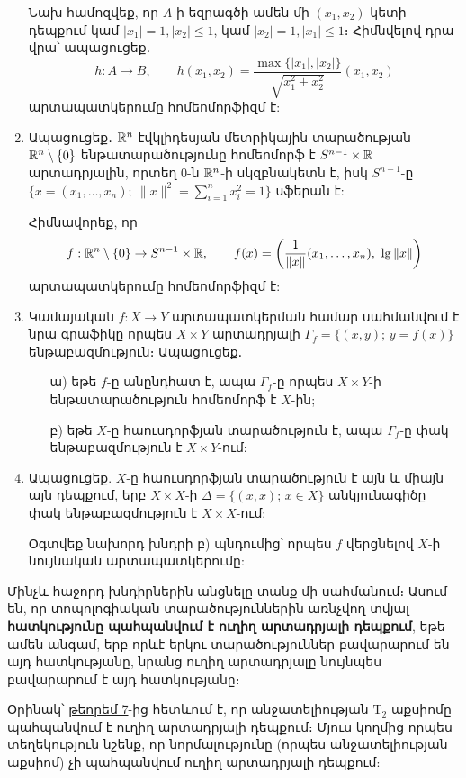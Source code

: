 \begin{enumerate}[label=\thesection.\arabic*.]
\begin{hint}
Նախ համոզվեք, որ $A$-ի եզրագծի ամեն մի $(x_1, x_2)$ կետի դեպքում կամ $|x_1|=1, |x_2| \le 1$, կամ $|x_2|=1, |x_1| \le 1$։ Հիմնվելով դրա վրա՝ ապացուցեք․
\[
h: A \to B, \qquad h(x_1, x_2) = \frac{\max\{|x_1|, |x_2|\}}{\sqrt{x_1^2+x_2^2}}(x_1, x_2)
\] 
արտապատկերումը հոմեոմորֆիզմ է:
\end{hint}

\item Ապացուցեք․ $\mathbb{R}^n$ էվկլիդեսյան մետրիկային տարածության $\mathbb{R}^n \setminus \{0\}$ ենթա\-տա\-րածությունը հոմեոմորֆ է $S^{n-1} \times \mathbb{R}$ արտադրյալին, որտեղ $0$-ն $\mathbb{R}^n$-ի սկզբնա\-կետն է, իսկ $S^{n-1}$-ը $\big\{x=(x_1, \dots, x_n);\ \|x\|^2 = \sum\limits_{i=1}^n x_i^2=1\big\}$ սֆերան է:

\begin{hint}
Հիմնավորեք, որ 
\[
f: \mathbb{R}^n \setminus \{0\} \to S^{n-1} \times \mathbb{R}, \qquad f(x)=\left(\frac{1}{\|x\|}(x_1, \dots, x_n),\ \lg \|x\|\right)\]
արտապատկերումը հոմեոմորֆիզմ է:
\end{hint}

\item Կամայական $f: X \to Y$ արտապատկերման համար սահմանվում է նրա գրա\-ֆիկը որպես $X \times Y$ արտադրյալի $\Gamma_f = \{(x,y);\, y=f(x)\}$ ենթաբազ\-մու\-թյուն։ Ապացուցեք․
\begin{enumerate}
    \item[ա)] եթե $f$-ը անընդհատ է, ապա $\Gamma_f$-ը որպես $X \times Y$-ի ենթատարածություն հոմեոմորֆ է $X$-ին;
    \item[բ)] եթե $X$-ը հաուսդորֆյան տարածություն է, ապա $\Gamma_f$-ը փակ ենթաբազմու\-թյուն է $X \times Y$-ում:
\end{enumerate}

\item Ապացուցեք. $X$-ը հաուսդորֆյան տարածություն է այն և միայն այն դեպքում, երբ $X \times X$-ի $\Delta = \{(x,x);\, x \in X\}$ անկյունագիծը փակ ենթաբազմություն է $X \times X$-ում:

\begin{hint}
Օգտվեք նախորդ խնդրի բ) պնդումից՝ որպես $f$ վերցնելով $X$-ի նույնական արտապատկերումը:
\end{hint}

\end{enumerate}

\par Մինչև հաջորդ խնդիրներին անցնելը տանք մի սահմանում։ Ասում են, որ տո\-պո\-լոգիական տարածություններին առնչվող տվյալ \textbf{հատկությունը պահպանվում է ուղիղ արտադրյալի դեպքում}, եթե ամեն անգամ, երբ որևէ երկու տարածություն\-ներ բավարարում են այդ հատկությանը, նրանց ուղիղ արտադրյալը նույնպես բա\-վա\-րարում է այդ հատկությանը։
\par Օրինակ՝ \hyperref[ch14thm7]{թեորեմ 7}-ից հետևում է, որ անջատելիության $\textrm{T}_2$ աքսիոմը պահպան\-վում է ուղիղ արտադրյալի դեպքում։ Մյուս կողմից որպես տեղեկություն նշենք, որ նոր\-մա\-լու\-թյունը (որպես անջատելիության աքսիոմ) չի պահպանվում ուղիղ արտա\-դրյալի դեպքում:

